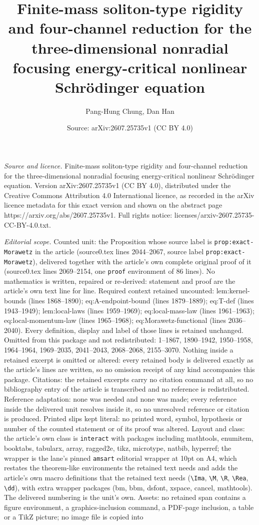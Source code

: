 \documentclass[10pt,a4paper]{amsart}
\title[Finite-mass soliton-type rigidity and four-channel reduction]{Finite-mass soliton-type rigidity and four-channel reduction for the three-dimensional nonradial focusing energy-critical nonlinear Schr\"odinger equation}
\author{Pang-Hung Chung, Dan Han}
\date{Source: arXiv:2607.25735v1 (CC BY 4.0)}
\begin{document}
\maketitle

\noindent\emph{Source and licence.} Finite-mass soliton-type rigidity and four-channel reduction for the three-dimensional nonradial focusing energy-critical nonlinear Schr\"odinger equation. Version arXiv:2607.25735v1 (CC BY 4.0), distributed under the Creative Commons Attribution 4.0 International licence, as recorded in the arXiv licence metadata for this exact version and shown on the abstract page https://arxiv.org/abs/2607.25735v1. Full rights notice: licenses/arxiv-2607.25735-CC-BY-4.0.txt.\par\smallskip

\noindent\textit{Editorial scope.} Counted unit: the Proposition whose source label is \texttt{prop:exact-Morawetz} in the article (source0.tex lines 2044--2067, source label \texttt{prop:exact-Morawetz}), delivered together with the article's own complete original proof of it (source0.tex lines 2069--2154, one \texttt{proof} environment of 86 lines). No mathematics is written, repaired or re-derived: statement and proof are the article's own text line for line. Required context retained uncounted: lem:kernel-bounds (lines 1868--1890); eq:A-endpoint-bound (lines 1879--1889); eq:T-def (lines 1943--1949); lem:local-laws (lines 1959--1969); eq:local-mass-law (lines 1961--1963); eq:local-momentum-law (lines 1965--1968); eq:Morawetz-functional (lines 2036--2040). Every definition, display and label of those lines is retained unchanged. Omitted from this package and not redistributed: 1--1867, 1890--1942, 1950--1958, 1964--1964, 1969--2035, 2041--2043, 2068--2068, 2155--3070. Nothing inside a retained excerpt is omitted or altered: every retained body is delivered exactly as the article's lines are written, so no omission receipt of any kind accompanies this package. Citations: the retained excerpts carry no citation command at all, so no bibliography entry of the article is transcribed and no reference is redistributed. Reference adaptation: none was needed and none was made; every reference inside the delivered unit resolves inside it, so no unresolved reference or citation is produced. Printed slips kept literal: no printed word, symbol, hypothesis or number of the counted statement or of its proof was altered. Layout and class: the article's own class is \texttt{interact} with packages including mathtools, enumitem, booktabs, tabularx, array, ragged2e, tikz, microtype, natbib, hyperref; the wrapper is the lane's pinned \texttt{amsart} editorial wrapper at 10pt on A4, which restates the theorem-like environments the retained text needs and adds the article's own macro definitions that the retained text needs (\texttt{\textbackslash Ima}, \texttt{\textbackslash M}, \texttt{\textbackslash R}, \texttt{\textbackslash Rea}, \texttt{\textbackslash dd}), with extra wrapper packages (bm, bbm, dsfont, xspace, cancel, mathtools). The delivered numbering is the unit's own. Assets: no retained span contains a figure environment, a graphics-inclusion command, a PDF-page inclusion, a table or a TikZ picture; no image file is copied into 
\end{document}
